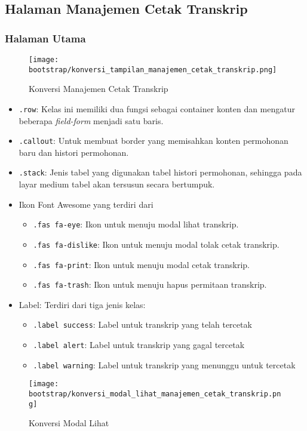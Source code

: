 \subsection{Halaman Manajemen Cetak Transkrip}
\subsubsection{Halaman Utama}
\begin{figure} [H]
	\centering  
	\texttt{[image: bootstrap/konversi\_tampilan\_manajemen\_cetak\_transkrip.png]}
	\caption{Konversi Manajemen Cetak Transkrip} 
\end{figure}
\begin{itemize}
	\item \texttt{.row}: Kelas ini memiliki dua fungsi sebagai container konten dan mengatur beberapa \textit{field-form} menjadi satu baris. 
	\item \texttt{.callout}: Untuk membuat border yang memisahkan konten permohonan baru dan histori permohonan.
	\item \texttt{.stack}: Jenis tabel yang digunakan tabel histori permohonan, sehingga pada layar medium tabel akan tersusun secara bertumpuk.
	\item Ikon Font Awesome yang terdiri dari 
	\begin{itemize}
		\item \texttt{.fas fa-eye}: Ikon untuk menuju modal lihat transkrip.
		\item \texttt{.fas fa-dislike}: Ikon untuk menuju modal tolak cetak transkrip.
		\item \texttt{.fas fa-print}: Ikon untuk menuju modal cetak transkrip.
		\item \texttt{.fas fa-trash}: Ikon untuk menuju hapus permitaan transkrip.
	\end{itemize}
	\item Label: Terdiri dari tiga jenis kelas:
	\begin{itemize}
		\item \texttt{.label success}: Label untuk transkrip yang telah tercetak
		\item \texttt{.label alert}: Label untuk transkrip yang gagal tercetak
		\item \texttt{.label warning}: Label untuk transkrip yang menunggu untuk tercetak
	\end{itemize}
	
\end{itemize}
\begin{figure} [H]
	\centering  
	\texttt{[image: bootstrap/konversi\_modal\_lihat\_manajemen\_cetak\_transkrip.png]}
	\caption{Konversi Modal Lihat} 
\end{figure}
